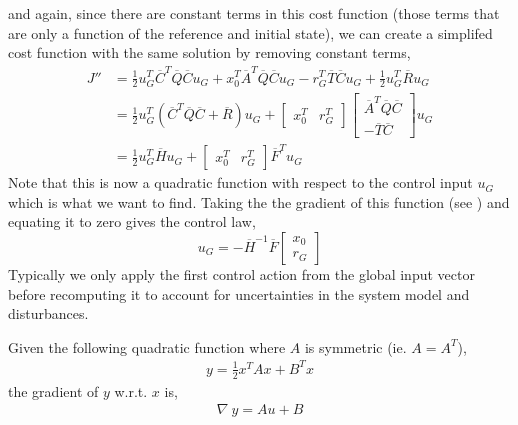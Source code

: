 \documentclass{article}
\newcommand{\doublebar}[1]{\overline{#1}}
\begin{document}
and again, since there are constant terms in this cost function (those terms that are only a function of the reference
and initial state), we can create a simplifed cost function with the same solution by removing constant terms,
\begin{align}
    J''
    &=
    \tfrac{1}{2}u_G^T\doublebar{C}^T\doublebar{Q}\doublebar{C}u_G
    + x_0^T\doublebar{A}^T\doublebar{Q}\doublebar{C}u_G
    - r_G^T\doublebar{T}\doublebar{C}u_G
    + \tfrac{1}{2}u_G^T\doublebar{R}u_G
    \\
    &=
    \tfrac{1}{2}u_G^T\left(\doublebar{C}^T\doublebar{Q}\doublebar{C} + \doublebar{R}\right)u_G
    +
    \begin{bmatrix} x_0^T & r_G^T \end{bmatrix}
    \begin{bmatrix} \doublebar{A}^T\doublebar{Q}\doublebar{C} \\ -\doublebar{T}\doublebar{C} \end{bmatrix} u_G
    \\
    &= \tfrac{1}{2}u_G^T\doublebar{H}u_G +  \begin{bmatrix} x_0^T & r_G^T \end{bmatrix}\doublebar{F}^Tu_G
    \label{eq:unconstrained-cost}
\end{align}
Note that this is now a quadratic function with respect to the control input $u_G$ which is what we want to find.
Taking the the gradient of this function (see ) and equating it to zero gives the
control law,
\begin{equation}
    u_G = - \doublebar{H}^{-1}\doublebar{F}\begin{bmatrix} x_0 \\ r_G \end{bmatrix}
\end{equation}
Typically we only apply the first control action from the global input vector before recomputing it to account for
uncertainties in the system model and disturbances.

\begin{tcolorbox}[title={Gradient of Quadratic Functions}]
    Given the following quadratic function where $A$ is symmetric (ie. $A=A^T$),
    \begin{align}
        y = \frac{1}{2}x^TAx + B^Tx
        \label{eq:grad-a}
    \end{align}
    the gradient of $y$ w.r.t. $x$ is,
    \begin{align}
        \nabla~y = Au + B
        \label{eq:grad-b}
    \end{align}
\end{tcolorbox}
\end{document}

